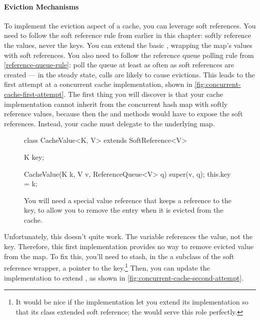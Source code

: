 \paragraph{Eviction Mechanisms}
To implement the eviction aspect of a cache, you can leverage soft references.
You need to follow the soft reference rule from earlier in this chapter: softly
reference the values, never the keys. You can extend the basic
, wrapping the map's values with soft references. You
also need to follow the reference queue polling rule from
\autoref{reference-queue-rule}: poll the queue at least as often as soft
references are created --- in the steady state,  calls are likely to
cause evictions. This leads to the first attempt at a concurrent cache
implementation, shown in \autoref{fig:concurrent-cache-first-attempt}. The first
thing you will discover is that your cache implementation cannot inherit from
the concurrent hash map with softly reference values, because then the
 and  methods would have to expose the soft references.
Instead, your cache must delegate to the underlying map. 

\begin{wrapfigure}{l}{0.43\textwidth}
\centering
\begin{framedlisting}
class CacheValue<K, V> extends SoftReference<V> {
  K key;
   
  CacheValue(K k, V v, ReferenceQueue<V> q) {
    super(v, q);
    this.key = k;
  }
}
\end{framedlisting}
\caption{You will need a special value reference that keeps a reference to the
key, to allow you to remove the entry when it is evicted from the cache.}
\end{wrapfigure}

Unfortunately, this doesn't quite work. The variable  references the
value, not the key. Therefore, this first implementation provides no way to
remove evicted value from the map. To fix this, you'll need to stash, in the a
subclass of the soft reference wrapper, a pointer to the key.\footnote{It would
be nice if the  implementation let you extend its
implementation so that its  class extended soft reference; the
 would serve this role perfectly.} Then, you can update the
 implementation to extend
, as shown in
\autoref{fig:concurrent-cache-second-attempt}.

